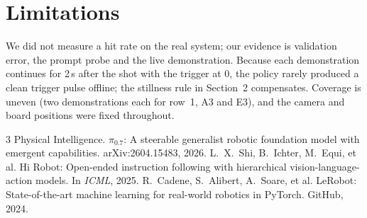 \documentclass[10pt,letterpaper]{article}
\begin{document}
\section{Limitations}

We did not measure a hit rate on the real system; our evidence is validation error, the prompt probe and the live demonstration. Because each demonstration continues for 2\,s after the shot with the trigger at 0, the policy rarely produced a clean trigger pulse offline; the stillness rule in Section~2 compensates. Coverage is uneven (two demonstrations each for row~1, A3 and E3), and the camera and board positions were fixed throughout.


\footnotesize\raggedright
\renewcommand{\refname}{\normalsize References}
\begin{thebibliography}{3}
\setlength{\itemsep}{1pt}
 Physical Intelligence. $\pi_{0.7}$: A steerable generalist robotic foundation model with emergent capabilities. arXiv:2604.15483, 2026.
 L.~X.~Shi, B.~Ichter, M.~Equi, et al. Hi Robot: Open-ended instruction following with hierarchical vision-language-action models. In \emph{ICML}, 2025.
 R.~Cadene, S.~Alibert, A.~Soare, et al. LeRobot: State-of-the-art machine learning for real-world robotics in PyTorch. GitHub, 2024.
\end{thebibliography}
\end{document}
